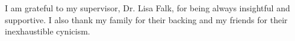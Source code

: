 I am grateful to my supervisor, Dr. Lisa Falk, for being always insightful and
supportive.
I also thank my family for their backing and my friends for their inexhaustible
cynicism.

